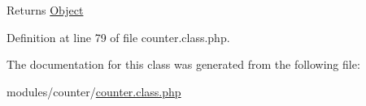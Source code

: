 \begin{DoxyReturn}{Returns}
\hyperlink{classObject}{Object} 
\end{DoxyReturn}


Definition at line 79 of file counter.\-class.\-php.



The documentation for this class was generated from the following file\-:\begin{DoxyCompactItemize}
\item 
modules/counter/\hyperlink{counter_8class_8php}{counter.\-class.\-php}\end{DoxyCompactItemize}
